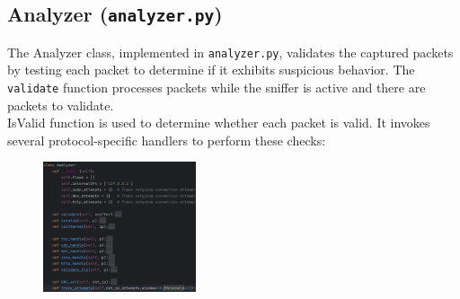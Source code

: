 \documentclass{article}
\begin{document}
\subsection{Analyzer (\texttt{analyzer.py})}
The Analyzer class, implemented in \texttt{analyzer.py}, validates the captured packets by testing each packet to determine if it exhibits suspicious behavior. The \texttt{validate} function processes packets while the sniffer is active and there are packets to validate. \\
IsValid function is used to determine whether each packet is valid. 
It invokes several protocol-specific handlers to perform these checks:
\begin{figure}[H]
    \centering
    \includegraphics[width=0.4\textwidth]{analyzer.png}
\end{figure} 
\end{document}
